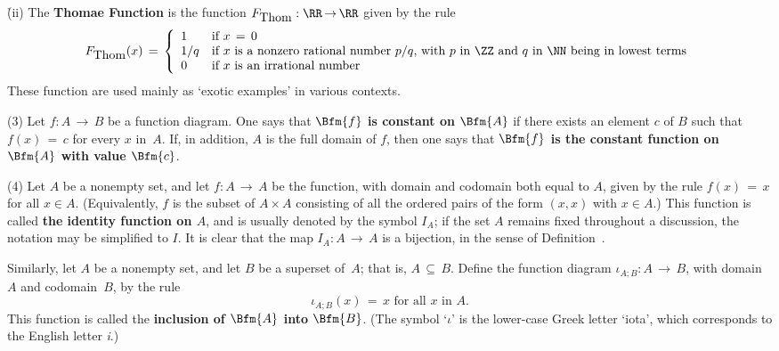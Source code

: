         \h (ii) The {\bf Thomae Function} is the function $F_{\mbox{Thom}}:{\RR} \,{\rightarrow}\, {\RR}$ given by the rule
        \begin{displaymath}
        F_{\mbox{Thom}}(x) \,=\, \left\{
        \begin{array}{ll}
        1 & \mbox{if $x \,=\, 0$} \\
        1/q & \mbox{if $x$ is a nonzero rational number $p/q$, with $p$ in ${\ZZ}$ and $q$ in ${\NN}$ being in lowest terms} \\
        0 & \mbox{if $x$ is an irrational number}
        \end{array}
            \right.
        \end{displaymath}
    These function are used mainly as `exotic examples' in various contexts.

\V

        (3) Let $f:A \,{\rightarrow}\, B$ be a function diagram. One says that {\bf $\Bfm{f}$ is constant on $\Bfm{A}$} if there exists an element $c$ of $B$ such that $f(x) \,=\, c$ for every $x$ in~$A$.
    If, in addition, $A$ is the full domain of $f$, then one says that {\bf $\Bfm{f}$ is the constant function on $\Bfm{A}$ with value $\Bfm{c}$}.

\V

        (4) Let $A$ be a nonempty set, and let $f:A \,{\rightarrow}\, A$ be the function, with domain and codomain both equal to $A$, given by the rule $f(x) \,=\, x$ for all $x{\in}A$.
    (Equivalently, $f$ is the subset of $A{\times}A$ consisting of all the ordered pairs of the form $(x,x)$ with $x{\in}A$.)
    This function is called {\bf the identity function on $A$},
    and is usually denoted by the symbol $I_{A}$; if the set $A$ remains fixed throughout a discussion, the notation may be simplified to $I$.
    It is clear that the map $I_{A}:A \,{\rightarrow}\, A$ is a bijection, in the sense of Definition~.

        Similarly, let $A$ be a nonempty set, and let $B$ be a superset of~$A$; that is, $A \,{\subseteq}\, B$.
    Define the function diagram ${\iota}_{A;B}:A \,{\rightarrow}\, B$, with domain $A$ and codomain~$B$, by the rule
        \begin{displaymath}
        {\iota}_{A;B}(x) \,=\, x \mbox{ for all $x$ in $A$}.
        \end{displaymath}
    This function is called the {\bf inclusion of $\Bfm{A}$ into $\Bfm{B}$}.
    (The symbol `${\iota}$' is the lower-case Greek letter `iota', which corresponds to the English letter {\em i}.)

